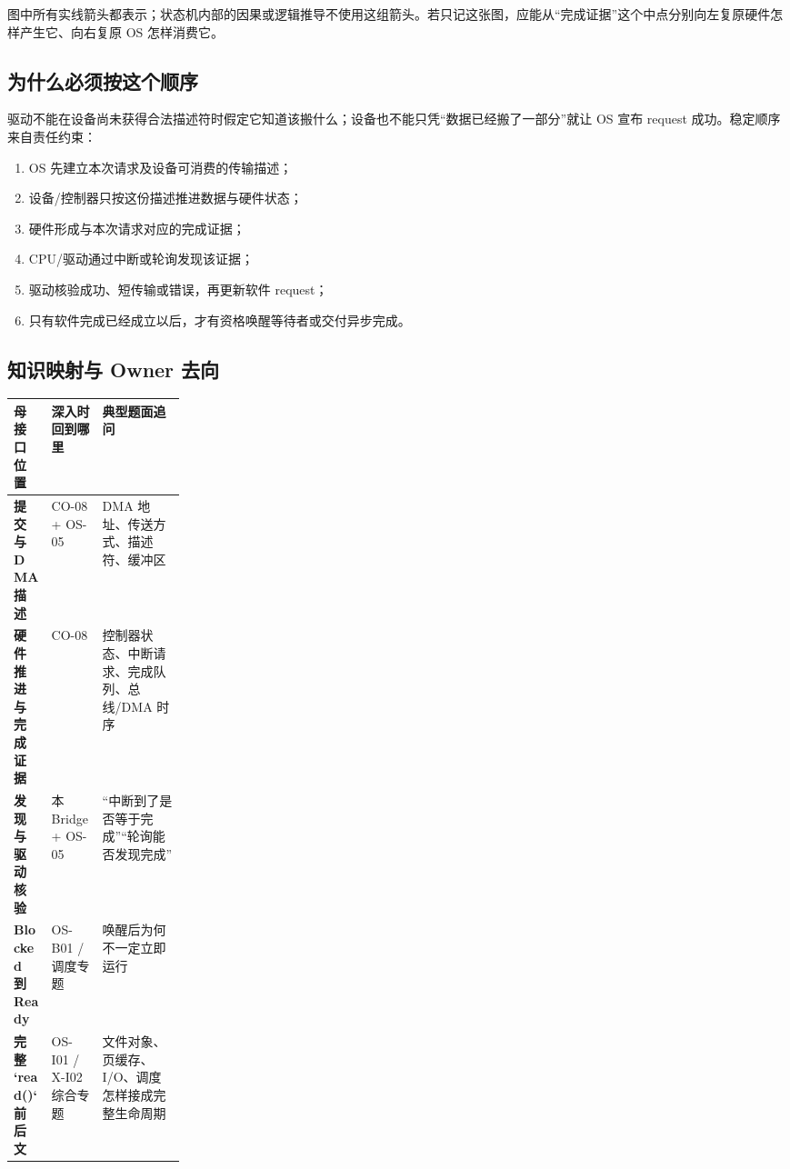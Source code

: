 \documentclass[UTF8,fontset=none,11pt,a4paper]{ctexart}
\begin{document}
图中所有实线箭头都表示；状态机内部的因果或逻辑推导不使用这组箭头。若只记这张图，应能从“完成证据”这个中点分别向左复原硬件怎样产生它、向右复原 OS 怎样消费它。

\subsection{为什么必须按这个顺序}

驱动不能在设备尚未获得合法描述符时假定它知道该搬什么；设备也不能只凭“数据已经搬了一部分”就让 OS 宣布 request 成功。稳定顺序来自责任约束：

\begin{enumerate}
  \item OS 先建立本次请求及设备可消费的传输描述；
  \item 设备/控制器只按这份描述推进数据与硬件状态；
  \item 硬件形成与本次请求对应的完成证据；
  \item CPU/驱动通过中断或轮询发现该证据；
  \item 驱动核验成功、短传输或错误，再更新软件 request；
  \item 只有软件完成已经成立以后，才有资格唤醒等待者或交付异步完成。
\end{enumerate}

\subsection{知识映射与 Owner 去向}

\begin{center}
\small
\renewcommand{\arraystretch}{1.22}
\begin{tabularx}{\linewidth}{>{\bfseries}p{0.22\linewidth} X X}
\toprule
母接口位置 & 深入时回到哪里 & 典型题面追问 \\
\midrule
提交与 DMA 描述 & CO-08 + OS-05 & DMA 地址、传送方式、描述符、缓冲区 \\
硬件推进与完成证据 & CO-08 & 控制器状态、中断请求、完成队列、总线/DMA 时序 \\
发现与驱动核验 & 本 Bridge + OS-05 & “中断到了是否等于完成”“轮询能否发现完成” \\
Blocked 到 Ready & OS-B01 / 调度专题 & 唤醒后为何不一定立即运行 \\
完整 `read()` 前后文 & OS-I01 / X-I02 综合专题 & 文件对象、页缓存、I/O、调度怎样接成完整生命周期 \\
\bottomrule
\end{tabularx}
\end{center}
\end{document}
